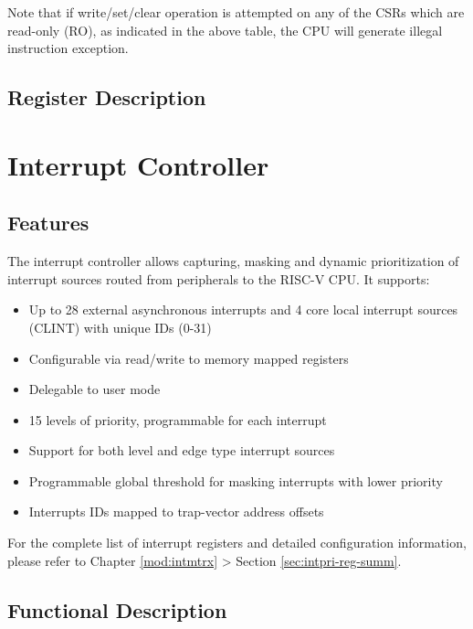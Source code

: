 \documentclass[main\_\_EN.tex]{subfiles}
\begin{document}
Note that if write/set/clear operation is attempted on any of the CSRs which are read-only (RO), as indicated in the above table, the CPU will generate illegal instruction exception.

\subsection{Register Description}






\clearpage
\section{Interrupt Controller}
\label{sec:riscvcpu-int-ctrl}

\subsection{Features}
\label{sec:riscvcpu-int-features}

The interrupt controller allows capturing, masking and dynamic prioritization of interrupt sources routed from peripherals to the RISC-V CPU. It supports:

\begin{itemize}
    \item Up to 28 external asynchronous interrupts and 4 core local interrupt sources (CLINT) with unique IDs (0-31)
    \item Configurable via read/write to memory mapped registers
    \item Delegable to user mode
    \item 15 levels of priority, programmable for each interrupt
    \item Support for both level and edge type interrupt sources
    \item Programmable global threshold for masking interrupts with lower priority
    \item Interrupts IDs mapped to trap-vector address offsets
\end{itemize}

For the complete list of interrupt registers and detailed configuration information, please refer to Chapter \ref{mod:intmtrx} \textit{} > Section \ref{sec:intpri-reg-summ}.

\subsection{Functional Description}
\label{sec:riscvcpu-int-func-descr}
\end{document}
